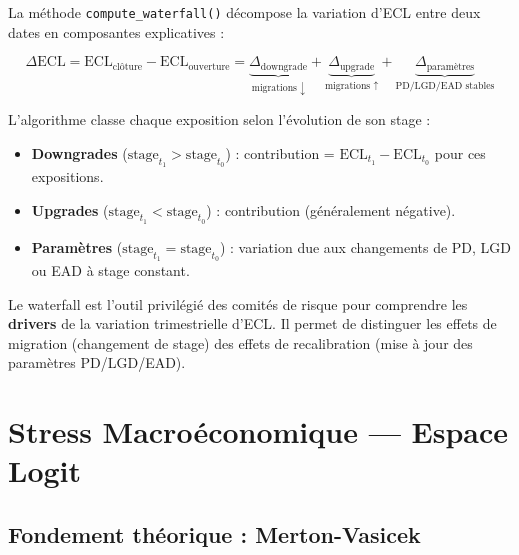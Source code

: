 \documentclass[12pt,a4paper]{article}
\begin{document}
La m\'ethode \texttt{compute\_waterfall()} d\'ecompose la variation d'ECL entre deux dates en composantes explicatives :

\begin{formulebox}
\begin{equation}
\Delta \text{ECL} = \text{ECL}_{\text{cl\^oture}} - \text{ECL}_{\text{ouverture}} = \underbrace{\Delta_{\text{downgrade}}}_{\text{migrations } \downarrow} + \underbrace{\Delta_{\text{upgrade}}}_{\text{migrations } \uparrow} + \underbrace{\Delta_{\text{param\`etres}}}_{\text{PD/LGD/EAD stables}}
\end{equation}
\end{formulebox}

L'algorithme classe chaque exposition selon l'\'evolution de son stage :
\begin{itemize}
    \item \textbf{Downgrades} ($\text{stage}_{t_1} > \text{stage}_{t_0}$) : contribution = $\text{ECL}_{t_1} - \text{ECL}_{t_0}$ pour ces expositions.
    \item \textbf{Upgrades} ($\text{stage}_{t_1} < \text{stage}_{t_0}$) : contribution (g\'en\'eralement n\'egative).
    \item \textbf{Param\`etres} ($\text{stage}_{t_1} = \text{stage}_{t_0}$) : variation due aux changements de PD, LGD ou EAD \`a stage constant.
\end{itemize}

\begin{interpretbox}
Le waterfall est l'outil privil\'egi\'e des comit\'es de risque pour comprendre les \textbf{drivers} de la variation trimestrielle d'ECL. Il permet de distinguer les effets de migration (changement de stage) des effets de recalibration (mise \`a jour des param\`etres PD/LGD/EAD).
\end{interpretbox}

\newpage
\section{Stress Macro\'economique --- Espace Logit}
\label{sec:stress}

\subsection{Fondement th\'eorique : Merton-Vasicek}
\end{document}
